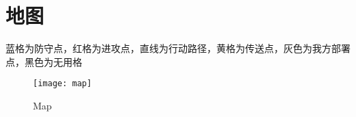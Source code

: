 \documentclass[a4paper,12pt]{article}
\begin{document}
	\section{地图}
		蓝格为防守点，红格为进攻点，直线为行动路径，黄格为传送点，灰色为我方部署点，黑色为无用格
		\begin{figure}[p]
			\centering
			\texttt{[image: map]}
			\caption{Map}
		\end{figure}
\end{document}
